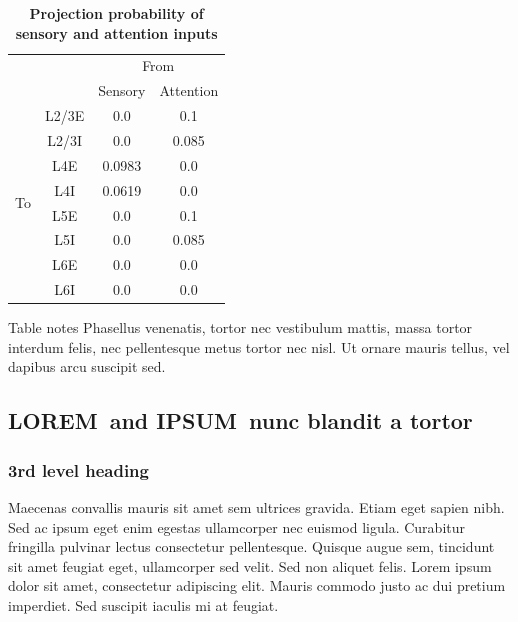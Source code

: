 \documentclass[10pt,letterpaper]{article}
\newcommand{\lorem}{{\bf LOREM}}
\newcommand{\ipsum}{{\bf IPSUM}}
\begin{document}
\begin{table}[!ht]
\centering
\caption{
{\bf Projection probability of sensory and attention inputs}}
\begin{tabular}[t]{cccc}
\toprule
&&\multicolumn{2}{c}{From} \\
&& Sensory & Attention \\
\midrule
\multirow{8}{*}{To} & \multicolumn{1}{c|}{L2/3E} & 0.0 & 0.1 \\ %
&\multicolumn{1}{c|}{L2/3I} & 0.0 & 0.085 \\ %
&\multicolumn{1}{c|}{L4E} & 0.0983 & 0.0 \\ %
&\multicolumn{1}{c|}{L4I} & 0.0619 & 0.0 \\ %
&\multicolumn{1}{c|}{L5E} &  0.0 & 0.1 \\ %
&\multicolumn{1}{c|}{L5I} &  0.0 & 0.085 \\ %
&\multicolumn{1}{c|}{L6E} &  0.0 & 0.0 \\ %
&\multicolumn{1}{c|}{L6I} &  0.0 & 0.0 \\ %
\bottomrule
\end{tabular}
\begin{flushleft} Table notes Phasellus venenatis, tortor nec vestibulum mattis, massa tortor interdum felis, nec pellentesque metus tortor nec nisl. Ut ornare mauris tellus, vel dapibus arcu suscipit sed.
\end{flushleft}
\label{table3}
\end{table}



\subsection*{\lorem\ and \ipsum\ nunc blandit a tortor}
\subsubsection*{3rd level heading} 
Maecenas convallis mauris sit amet sem ultrices gravida. Etiam eget sapien nibh. Sed ac ipsum eget enim egestas ullamcorper nec euismod ligula. Curabitur fringilla pulvinar lectus consectetur pellentesque. Quisque augue sem, tincidunt sit amet feugiat eget, ullamcorper sed velit. Sed non aliquet felis. Lorem ipsum dolor sit amet, consectetur adipiscing elit. Mauris commodo justo ac dui pretium imperdiet. Sed suscipit iaculis mi at feugiat. 
\end{document}
